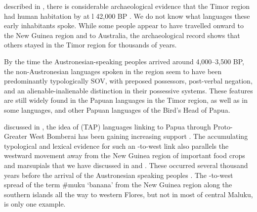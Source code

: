  described in ,
there is considerable archaeological evidence that the Timor
region had human habitation by at l 42,000 BP \citep{OConnor2015}.
We do not know what languages these early inhabitants spoke.
While some people appear to have travelled onward to the New
Guinea region and to Australia, the archaeological record shows that others
stayed in the Timor region for thousands of years.

By the time the Austronesian-speaking peoples arrived around
4,000--3,500 BP, the non-Austronesian languages spoken in the region seem to have
been predominantly typologically SOV,
with preposed possessors, post-verbal negation,
and an alienable-inalienable distinction in their possessive systems.
These features are still widely found in the Papuan 
languages in the Timor region,
as well as in some  languages,
and other Papuan languages of
the Bird’s Head of Papua.

 discussed in ,
the idea of  (TAP) languages linking to
Papua through Proto-Greater West Bomberai has been gaining increasing
support \citep{UsherSchapper2022}.
The accumulating typological and lexical evidence for such an
-to-west link also parallels the westward movement away from
the New Guinea region of important food crops
and marsupials that we have discussed in  and .
These occurred several thousand years before the arrival of the
Austronesian speaking peoples \citep{DenhamDonohue2009,DonohueDenham2009,
DonohueDenham2010,FlanneryNitihaminoto1995,Schapper2011}.
The -to-west spread of the term {\#}muku ‘banana’ from the
New Guinea region along the southern islands all the way to western
Flores, but not in most of central Maluku,
is only one example.